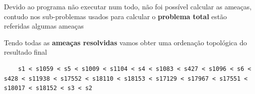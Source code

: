 \documentclass[11pt]{article}
\begin{document}
Devido ao programa não executar num todo, não foi possível calcular as ameaças, contudo 
nos sub-problemas usados para calcular o \textbf{problema total} estão referidas algumas ameaças

Tendo todas as \textbf{ameaças resolvidas} vamos obter uma ordenação topológica do resultado
final 
\begin{lstlisting}
    s1 < s1059 < s5 < s1009 < s1104 < s4 < s1083 < s427 < s1096 < s6 < s428 < s11938 < s17552 < s18110 < s18153 < s17129 < s17967 < s17551 < s18017 < s18152 < s3 < s2
\end{lstlisting}
\end{document}
